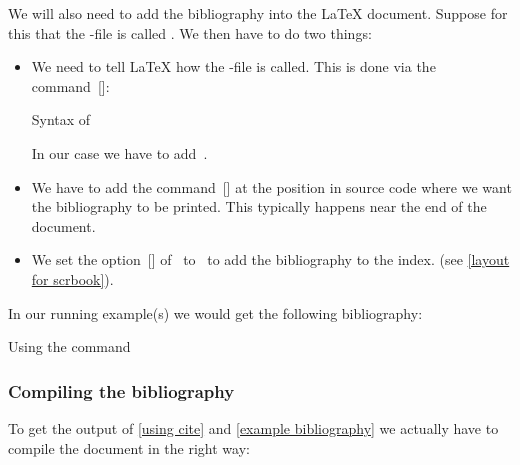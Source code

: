We will also need to add the bibliography into the {\LaTeX} document.
Suppose for this that the -file is called .
We then have to do two things:
\begin{itemize}
  \item
    We need to tell {\LaTeX} how the -file is called.
    This is done via the command~[\comname]:
    \begin{showcode}{Syntax of }

    \end{showcode}
    In our case we have to add~.
  \item
    We have to add the command~[\comname] at the position in source code where we want the bibliography to be printed.
    This typically happens near the end of the document.
  \item
    We set the option~[\optname] of~ to~ to add the bibliography to the index. (see \cref{layout for scrbook}).
\end{itemize}

In our running example(s) we would get the following bibliography:
\let\oldprintbibliography\printbibliography
\renewcommand{\printbibliography}{%
  \oldprintbibliography[
    heading   = subbibliography,
    title     = {Bibliography},
    category  = testentries
  ]
}
\begin{showlatex}[label = {example bibliography}]
  {Using the command~}
\printbibliography
\end{showlatex}
\let\printbibliography\oldprintbibliography



\subsubsection{Compiling the bibliography}

To get the output of \cref{using cite} and \cref{example bibliography} we actually have to compile the document in the right way:


